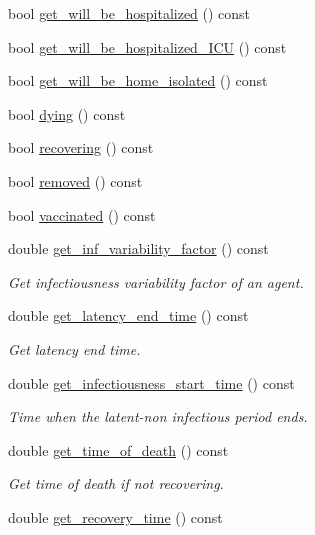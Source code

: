 \begin{DoxyCompactItemize}
\item 
bool \hyperlink{classAgent_a1581a3db8ffd6a7a13d2387cf6345eb1}{get\+\_\+will\+\_\+be\+\_\+hospitalized} () const
\item 
bool \hyperlink{classAgent_a3c65c26bebfa4b16ad9882868a96bd30}{get\+\_\+will\+\_\+be\+\_\+hospitalized\+\_\+\+I\+CU} () const
\item 
bool \hyperlink{classAgent_a55650a1c926725d86789ee640268f02b}{get\+\_\+will\+\_\+be\+\_\+home\+\_\+isolated} () const
\item 
bool \hyperlink{classAgent_ad6e8e45da0353e051e9e2fcf68d36bb2}{dying} () const
\item 
bool \hyperlink{classAgent_adbe591f0156d55ec1eca37a7d9f75fe4}{recovering} () const
\item 
bool \hyperlink{classAgent_ab04af1e2f506d5b9b050dc132c474065}{removed} () const
\item 
bool \hyperlink{classAgent_a71bd83fd47b042333f9ae04a50b3eefe}{vaccinated} () const
\item 
double \hyperlink{classAgent_abf59cadd5a25de00fdcfd404cf6aba6d}{get\+\_\+inf\+\_\+variability\+\_\+factor} () const
\begin{DoxyCompactList}\small\item\em Get infectiousness variability factor of an agent. \end{DoxyCompactList}\item 
double \hyperlink{classAgent_a9e29f6f7aeea13a45c2161ebc208d263}{get\+\_\+latency\+\_\+end\+\_\+time} () const
\begin{DoxyCompactList}\small\item\em Get latency end time. \end{DoxyCompactList}\item 
double \hyperlink{classAgent_a5ca1201f213cfa77612b9ab63dbdf977}{get\+\_\+infectiousness\+\_\+start\+\_\+time} () const
\begin{DoxyCompactList}\small\item\em Time when the latent-\/non infectious period ends. \end{DoxyCompactList}\item 
double \hyperlink{classAgent_a8de09742703024f9974a3aaea17dc7ab}{get\+\_\+time\+\_\+of\+\_\+death} () const
\begin{DoxyCompactList}\small\item\em Get time of death if not recovering. \end{DoxyCompactList}\item 
double \hyperlink{classAgent_a16335c804f8fc6d5dbbfc45e3b1e8276}{get\+\_\+recovery\+\_\+time} () const

\end{DoxyCompactItemize}
